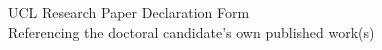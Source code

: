 


\newpage %
\begin{center}
\Large{UCL Research Paper Declaration Form}\\
\large{Referencing the doctoral candidate’s own published work(s)}
\vskip 1cm
\end{center}

